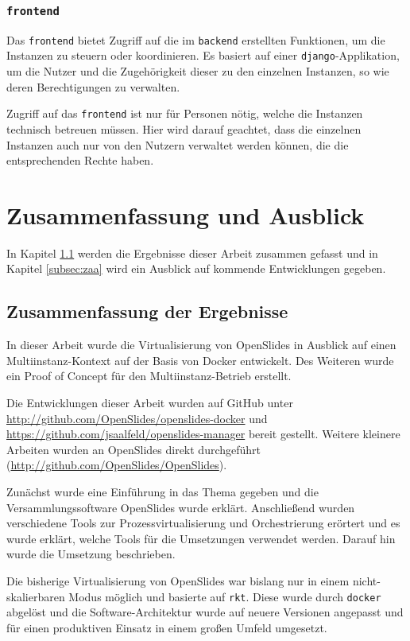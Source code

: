 \documentclass[11pt,a4paper]{article}
\begin{document}
\subsubsection{\texttt{frontend}} \label{subsec:ummf}
Das \texttt{frontend} bietet Zugriff auf die im \texttt{backend} erstellten 
Funktionen, um die Instanzen zu steuern oder koordinieren. Es basiert auf einer 
\texttt{django}-Applikation, um die Nutzer und die Zugehörigkeit dieser zu den 
einzelnen Instanzen, so wie deren Berechtigungen zu verwalten.

Zugriff auf das \texttt{frontend} ist nur für Personen nötig, welche die 
Instanzen technisch betreuen müssen. Hier wird darauf geachtet, dass die 
einzelnen Instanzen auch nur von den Nutzern verwaltet werden können, die die 
entsprechenden Rechte haben.
\clearpage
\section{Zusammenfassung und Ausblick}
\label{sec:za}
In Kapitel \ref{subsec:zaze} werden die Ergebnisse dieser Arbeit zusammen 
gefasst und in Kapitel \ref{subsec:zaa} wird ein Ausblick auf kommende 
Entwicklungen gegeben.
\subsection{Zusammenfassung der Ergebnisse} \label{subsec:zaze}
In dieser Arbeit wurde die Virtualisierung von OpenSlides in Ausblick auf einen 
Multiinstanz-Kontext auf der Basis von Docker entwickelt. Des Weiteren wurde 
ein Proof of Concept für den Multiinstanz-Betrieb erstellt.

Die Entwicklungen dieser Arbeit wurden auf GitHub unter
\url{http://github.com/OpenSlides/openslides-docker} und
\url{https://github.com/jsaalfeld/openslides-manager} bereit gestellt. Weitere 
kleinere Arbeiten wurden an OpenSlides direkt durchgeführt 
(\url{http://github.com/OpenSlides/OpenSlides}).

Zunächst wurde eine Einführung in das Thema gegeben und die 
Versammlungssoftware OpenSlides wurde erklärt. Anschließend wurden verschiedene 
Tools zur Prozessvirtualisierung und Orchestrierung erörtert und es wurde 
erklärt, welche Tools für die Umsetzungen verwendet werden. Darauf hin wurde die 
Umsetzung beschrieben.

Die bisherige Virtualisierung von OpenSlides war bislang nur in einem 
nicht-skalierbaren Modus möglich und basierte auf \texttt{rkt}. Diese wurde 
durch \texttt{docker} abgelöst und die Software-Architektur wurde auf neuere 
Versionen angepasst und für einen produktiven Einsatz in einem großen Umfeld 
umgesetzt.
\end{document}
